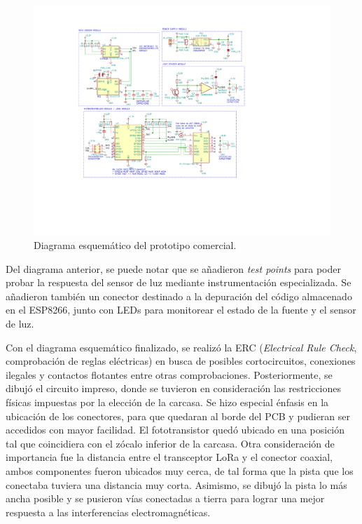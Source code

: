 \begin{figure}[h]
	\centering
	\includegraphics[scale=0.9]{./Figures/schematic.pdf}
	\caption{Diagrama esquemático del prototipo comercial.}
		\label{fig:schematic}
\end{figure}

Del diagrama anterior, se puede notar que se añadieron \textit{test points} para poder probar la respuesta del sensor de luz mediante instrumentación especializada. Se añadieron también un conector destinado a la depuración del código almacenado en el ESP8266, junto con LEDs para monitorear el estado de la fuente y el sensor de luz.

Con el diagrama esquemático finalizado, se realizó la ERC (\textit{Electrical Rule Check}, comprobación de reglas eléctricas) en busca de posibles cortocircuitos, conexiones ilegales y contactos flotantes entre otras comprobaciones. Posteriormente, se dibujó el circuito impreso, donde se tuvieron en consideración las restricciones físicas impuestas por la elección de la carcasa. Se hizo especial énfasis en la ubicación de los conectores, para que quedaran al borde del PCB y pudieran ser accedidos con mayor facilidad. El fototransistor quedó ubicado en una posición tal que coincidiera con el zócalo inferior de la carcasa. Otra consideración de importancia fue la distancia entre el transceptor LoRa y el conector coaxial, ambos componentes fueron ubicados muy cerca, de tal forma que la pista que los conectaba tuviera una distancia muy corta. Asimismo, se dibujó la pista lo más ancha posible y se pusieron vías conectadas a tierra para lograr una mejor respuesta a las interferencias electromagnéticas.

